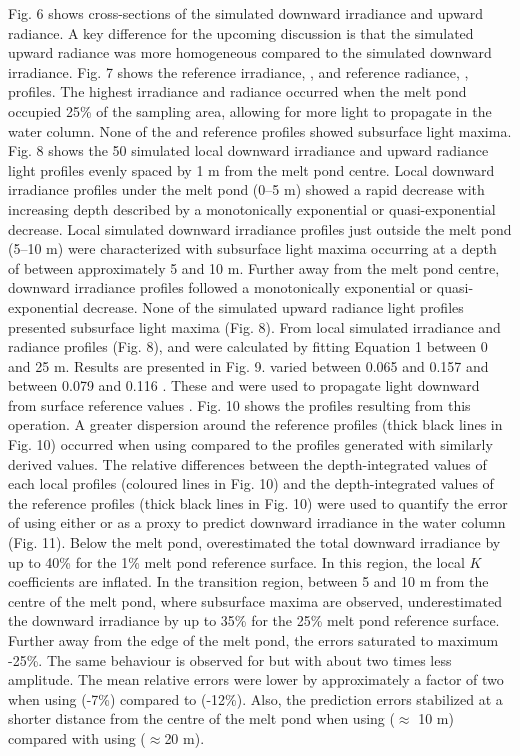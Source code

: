 Fig. 6 shows cross-sections of the simulated downward irradiance and upward radiance. A key difference for the upcoming discussion is that the simulated upward radiance was more homogeneous compared to the simulated downward irradiance. Fig. 7 shows the reference irradiance, \edz{}, and reference radiance, \luz{}, profiles. The highest irradiance and radiance occurred when the melt pond occupied 25\% of the sampling area, allowing for more light to propagate in the water column. None of the \edz{} and \luz{} reference profiles showed subsurface light maxima. Fig. 8 shows the 50 simulated local downward irradiance and upward radiance light profiles evenly spaced by 1 m from the melt pond centre. Local downward irradiance profiles under the melt pond (0--5 m) showed a rapid decrease with increasing depth described by a monotonically exponential or quasi-exponential decrease. Local simulated downward irradiance profiles just outside the melt pond (5--10 m) were characterized with subsurface light maxima occurring at a depth of between approximately 5 and 10 m. Further away from the melt pond centre, downward irradiance profiles followed a monotonically exponential or quasi-exponential decrease. None of the simulated upward radiance light profiles presented subsurface light maxima (Fig. 8). From local simulated irradiance and radiance profiles (Fig. 8), \ked{} and \klu{} were calculated by fitting Equation 1 between 0 and 25 m. Results are presented in Fig. 9. \ked{} varied between 0.065 and 0.157 \mminus{} and \klu{} between 0.079 and 0.116 \mminus{}. These \ked{} and \klu{} were used to propagate light downward from surface reference values \edzero{}. Fig. 10 shows the profiles resulting from this operation. A greater dispersion around the reference profiles (thick black lines in Fig. 10) occurred when using \ked{} compared to the profiles generated with similarly derived \klu{} values. The relative differences between the depth-integrated values of each local profiles (coloured lines in Fig. 10) and the depth-integrated values of the reference profiles (thick black lines in Fig. 10) were used to quantify the error of using either \ked{} or \klu{} as a proxy to predict downward irradiance in the water column (Fig. 11). Below the melt pond, \ked{} overestimated the total downward irradiance by up to 40\% for the 1\% melt pond reference surface. In this region, the local $K$ coefficients are inflated. In the transition region, between 5 and 10 m from the centre of the melt pond, where subsurface maxima are observed, \ked{} underestimated the downward irradiance by up to 35\% for the 25\% melt pond reference surface. Further away from the edge of the melt pond, the errors saturated to maximum -25\%. The same behaviour is observed for \klu{} but with about two times less amplitude. The mean relative errors were lower by approximately a factor of two when using \klu{} (-7\%) compared to \ked{} (-12\%). Also, the prediction errors stabilized at a shorter distance from the centre of the melt pond when using \klu{} ($\approx$ 10 m) compared with using \ked{} ($\approx$20 m). 

